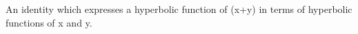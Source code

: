 An identity which expresses a hyperbolic function of (x+y) in terms of hyperbolic 
functions of x and y.